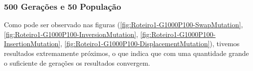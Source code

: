 \subsubsection{500 Gerações e 50 População}

Como pode ser observado nas figuras (\ref{fig:Roteiro1-G1000P100-SwapMutation}, \ref{fig:Roteiro1-G1000P100-InversionMutation}, \ref{fig:Roteiro1-G1000P100-InsertionMutation}, \ref{fig:Roteiro1-G1000P100-DisplacementMutation}), tivemos resultados extremamente próximos, o que indica que com uma quantidade grande o suficiente de gerações os resultados convergem.

\begin{center}
	\label{fig:Roteiro1-G1000P100-DisplacementMutation}
\end{center}
\begin{center}
	\label{fig:Roteiro1-G1000P100-InsertionMutation}
\end{center}
